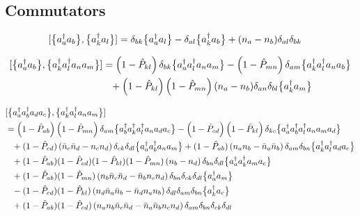 {%
\subsection*{Commutators}

\begin{align}
  [{\big\{a^\dag_{a}a_{b}\big\}},{\big\{a^\dag_{k}a_{l}\big\}}]
  &=\delta_{bk}\big\{a^\dag_{a}a_{l}\big\}-\delta_{al}\big\{a^\dag_{k}a_{b}\big\}+(n_{a}-n_{b})\delta_{al}\delta_{bk}
\end{align}


\begin{align}
  [{\big\{a^\dag_{a}a_{b}\big\}},{\big\{a^\dag_{k}a^\dag_{l}a_{n}a_{m}\big\}}]
  &
    =\left(1-\hat{P}_{kl}\right)\delta_{bk}\big\{a^\dag_{a}a^\dag_{l}a_{n}a_{m}\big\}
    -\left(1-\hat{P}_{mn}\right)\delta_{am}\big\{a^\dag_{k}a^\dag_{l}a_{n}a_{b}\big\}
    \notag\\
  &\hphantom{=}  
    +\left(1-\hat{P}_{kl}\right)\left(1-\hat{P}_{mn}\right)(n_a-n_b)\delta_{an}\delta_{bl}\big\{a^\dag_{k}a_{m}\big\}
\end{align}


\begin{align}
  &\comm{\nord{\aaO_{a}\aaO_{b}\aO_{d}\aO_{c}}}{\nord{\aaO_{k}\aaO_{l}\aO_{n}\aO_{m}}}
  \notag\\
  &=
    \left(1-\PO_{ab}\right)\left(1-\PO_{mn}\right)\delta_{am}\nord{\aaO_{b}\aaO_{k}\aaO_{l}\aO_{n}\aO_{d}\aO_{c}}
    -\left(1-\PO_{cd}\right)\left(1-\PO_{kl}\right)\delta_{kc}\nord{\aaO_{a}\aaO_{b}\aaO_{l}\aO_{n}\aO_{m}\aO_{d}}
  \notag\\
%  
  &\hphantom{=}
    +(1-\PO_{cd})\left(\nn_{c}\nn_{d} - n_c n_d \right)\delta_{ck}\delta_{dl}\nord{\aaO_{a}\aaO_{b}\aO_{n}\aO_{m}}
    +(1-\PO_{ab})\left(n_a n_b -\nn_{a} \nn_{b} \right)\delta_{am}\delta_{bn}\nord{\aaO_{k}\aaO_{l}\aO_{d}\aO_{c}}
  \notag\\
  &\hphantom{=}
    +(1-\PO_{ab})(1-\PO_{cd})(1-\PO_{kl})(1-\PO_{mn})\left(n_{b} - n_{d}\right)\delta_{bn}\delta_{dl}
    \nord{\aaO_{a}\aaO_{k}\aO_{m}\aO_{c}}
  \notag\\
%
  &\hphantom{=}
   +(1-\PO_{ab})(1-\PO_{mn})\left(n_{b}\nn_{c}\nn_{d} - \nn_{b}n_{c}n_{d}\right)\delta_{bn}\delta_{ck}\delta_{dl}
   \nord{\aaO_{a}\aO_{m}}
  \notag\\
% 
  &\hphantom{=}
   -(1-\PO_{cd})(1-\PO_{kl})\left(n_{d}\nn_{a}\nn_{b} - \nn_{d}n_{a}n_{b}\right)\delta_{dl}\delta_{am}\delta_{bn}
   \nord{\aaO_{k}\aO_{c}}
  \notag\\
% 
% 
  &\hphantom{=}
  +(1-\PO_{ab})(1-\PO_{cd})
    \left(n_{a} n_{b} \nn_{c} \nn_{d} - \nn_{a} \nn_{b} n_{c} n_{d}\right)\delta_{am}\delta_{bn}\delta_{ck}\delta_{dl}
% 
\end{align}


% 


} 

